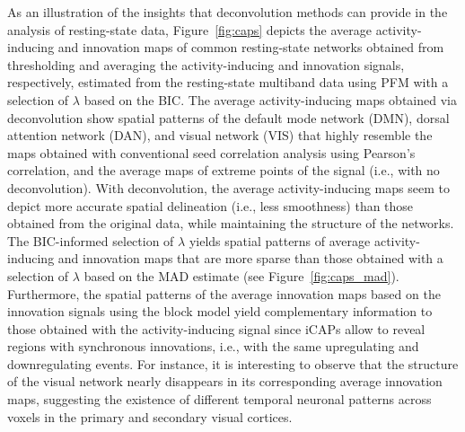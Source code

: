 As an illustration of the insights that deconvolution methods can provide in the
analysis of resting-state data, Figure~\ref{fig:caps} depicts the
average activity-inducing and innovation maps
of common resting-state networks obtained from thresholding
and averaging the activity-inducing and innovation signals, respectively,
estimated from the resting-state multiband data using PFM with a selection of
$\lambda$ based on the BIC. The average activity-inducing maps
obtained via deconvolution show spatial patterns of the default mode network
(DMN), dorsal attention network (DAN), and visual network (VIS) that highly
resemble the maps obtained with conventional seed correlation analysis using
Pearson's correlation, and the average maps of extreme points
of the signal (i.e., with no deconvolution). With deconvolution, the
average activity-inducing maps seem to depict more accurate
spatial delineation (i.e., less smoothness) than those obtained from the
original data, while maintaining the structure of the networks. The
BIC-informed selection of $\lambda$ yields spatial patterns of
average activity-inducing and innovation maps that are more
sparse than those obtained with a selection of $\lambda$ based on the MAD
estimate (see Figure~\ref{fig:caps_mad}). Furthermore, the spatial patterns of
the average innovation maps based on the innovation signals
using the block model yield complementary information to those obtained with the
activity-inducing signal since iCAPs allow to reveal regions with synchronous
innovations, i.e., with the same upregulating and downregulating events. For
instance, it is interesting to observe that the structure of the visual network
nearly disappears in its corresponding average innovation
maps, suggesting the existence of different temporal neuronal patterns across
voxels in the primary and secondary visual cortices.

